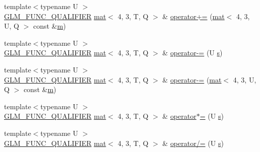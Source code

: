 \begin{DoxyCompactItemize}
\item 
{\footnotesize template$<$typename U $>$ }\\\hyperlink{setup_8hpp_a33fdea6f91c5f834105f7415e2a64407}{G\+L\+M\+\_\+\+F\+U\+N\+C\+\_\+\+Q\+U\+A\+L\+I\+F\+I\+ER} \hyperlink{structglm_1_1mat}{mat}$<$ 4, 3, T, Q $>$ \& \hyperlink{structglm_1_1mat_3_014_00_013_00_01_t_00_01_q_01_4_aef2c1c92ecc7a7780ef06345d516a8ef}{operator+=} (\hyperlink{structglm_1_1mat}{mat}$<$ 4, 3, U, Q $>$ const \&\hyperlink{_s_d_l__opengl__glext_8h_af593500c283bf1a787a6f947f503a5c2}{m})
\item 
{\footnotesize template$<$typename U $>$ }\\\hyperlink{setup_8hpp_a33fdea6f91c5f834105f7415e2a64407}{G\+L\+M\+\_\+\+F\+U\+N\+C\+\_\+\+Q\+U\+A\+L\+I\+F\+I\+ER} \hyperlink{structglm_1_1mat}{mat}$<$ 4, 3, T, Q $>$ \& \hyperlink{structglm_1_1mat_3_014_00_013_00_01_t_00_01_q_01_4_ac8a6b92078e6005a122912cbfba7f108}{operator-\/=} (U \hyperlink{_s_d_l__opengl_8h_a4af680a6c683f88ed67b76f207f2e6e4}{s})
\item 
{\footnotesize template$<$typename U $>$ }\\\hyperlink{setup_8hpp_a33fdea6f91c5f834105f7415e2a64407}{G\+L\+M\+\_\+\+F\+U\+N\+C\+\_\+\+Q\+U\+A\+L\+I\+F\+I\+ER} \hyperlink{structglm_1_1mat}{mat}$<$ 4, 3, T, Q $>$ \& \hyperlink{structglm_1_1mat_3_014_00_013_00_01_t_00_01_q_01_4_a6c96adf119836504e44d2050869b7d8b}{operator-\/=} (\hyperlink{structglm_1_1mat}{mat}$<$ 4, 3, U, Q $>$ const \&\hyperlink{_s_d_l__opengl__glext_8h_af593500c283bf1a787a6f947f503a5c2}{m})
\item 
{\footnotesize template$<$typename U $>$ }\\\hyperlink{setup_8hpp_a33fdea6f91c5f834105f7415e2a64407}{G\+L\+M\+\_\+\+F\+U\+N\+C\+\_\+\+Q\+U\+A\+L\+I\+F\+I\+ER} \hyperlink{structglm_1_1mat}{mat}$<$ 4, 3, T, Q $>$ \& \hyperlink{structglm_1_1mat_3_014_00_013_00_01_t_00_01_q_01_4_a4b3846610c3a67636b062fdeeee42243}{operator$\ast$=} (U \hyperlink{_s_d_l__opengl_8h_a4af680a6c683f88ed67b76f207f2e6e4}{s})
\item 
{\footnotesize template$<$typename U $>$ }\\\hyperlink{setup_8hpp_a33fdea6f91c5f834105f7415e2a64407}{G\+L\+M\+\_\+\+F\+U\+N\+C\+\_\+\+Q\+U\+A\+L\+I\+F\+I\+ER} \hyperlink{structglm_1_1mat}{mat}$<$ 4, 3, T, Q $>$ \& \hyperlink{structglm_1_1mat_3_014_00_013_00_01_t_00_01_q_01_4_ac85c9c099e9e7c43a4f04ae0c39582bd}{operator/=} (U \hyperlink{_s_d_l__opengl_8h_a4af680a6c683f88ed67b76f207f2e6e4}{s})
\end{DoxyCompactItemize}
